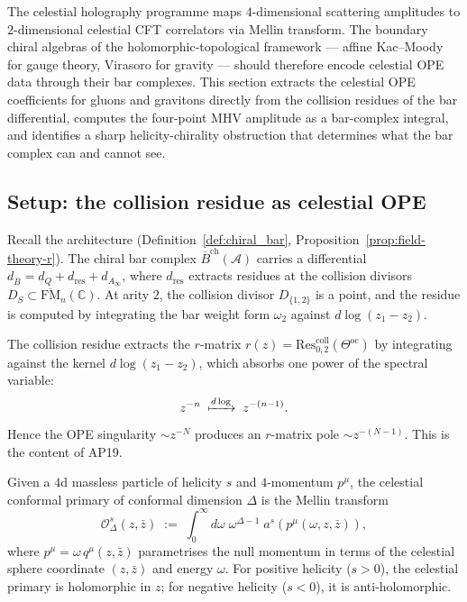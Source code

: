 \documentclass[11pt]{article}
\newcommand{\cA}{\mathcal{A}}
\newcommand{\cO}{\mathcal{O}}
\newcommand{\barB}{\overline{B}}
\newcommand{\C}{\mathbb{C}}
\begin{document}
The celestial holography programme maps $4$-dimensional scattering
amplitudes to $2$-dimensional celestial CFT correlators via Mellin
transform.  The boundary chiral algebras of the holomorphic-topological
framework --- affine Kac--Moody for gauge theory, Virasoro for gravity
--- should therefore encode celestial OPE data through their bar
complexes.  This section extracts the celestial OPE coefficients for
gluons and gravitons directly from the collision residues of the bar
differential, computes the four-point MHV amplitude as a bar-complex
integral, and identifies a sharp helicity-chirality obstruction that
determines what the bar complex can and cannot see.

\subsection{Setup: the collision residue as celestial OPE}
\label{subsec:celestial-collision-setup}

Recall the architecture (Definition~\ref{def:chiral_bar},
Proposition~\ref{prop:field-theory-r}).  The chiral bar complex
$\barB^{\mathrm{ch}}(\cA)$ carries a differential
$d_{\barB} = d_Q + d_{\mathrm{res}} + d_{A_\infty}$, where
$d_{\mathrm{res}}$ extracts residues at the collision divisors
$D_S \subset \overline{\mathrm{FM}}_n(\C)$.  At arity $2$, the
collision divisor $D_{\{1,2\}}$ is a point, and the residue is
computed by integrating the bar weight form $\omega_2$ against
$d\log(z_1 - z_2)$.

\begin{observation}
\label{obs:dlog-absorption-cel}
The collision residue extracts the $r$-matrix
$r(z) = \mathrm{Res}^{\mathrm{coll}}_{0,2}(\Theta^{\mathrm{oc}})$
by integrating against the kernel $d\log(z_1 - z_2)$, which absorbs
one power of the spectral variable:
\[
z^{-n} \;\xmapsto{d\log}\; z^{-(n-1)}.
\]
Hence the OPE singularity $\sim z^{-N}$ produces an $r$-matrix
pole $\sim z^{-(N-1)}$.  This is the content of AP19.
\end{observation}

\begin{definition}
\label{def:celestial-primary-cel}
Given a $4$d massless particle of helicity $s$ and $4$-momentum
$p^\mu$, the celestial conformal primary of conformal dimension
$\Delta$ is the Mellin transform
\[
\cO^s_\Delta(z,\bar z) \;:=\;
\int_0^\infty d\omega\; \omega^{\Delta - 1}\;
a^s(p^\mu(\omega, z, \bar z)),
\]
where $p^\mu = \omega\, q^\mu(z,\bar z)$ parametrises the null
momentum in terms of the celestial sphere coordinate $(z,\bar z)$ and
energy $\omega$.  For positive helicity ($s > 0$), the celestial
primary is holomorphic in $z$; for negative helicity ($s < 0$), it is
anti-holomorphic.
\end{definition}
\end{document}

